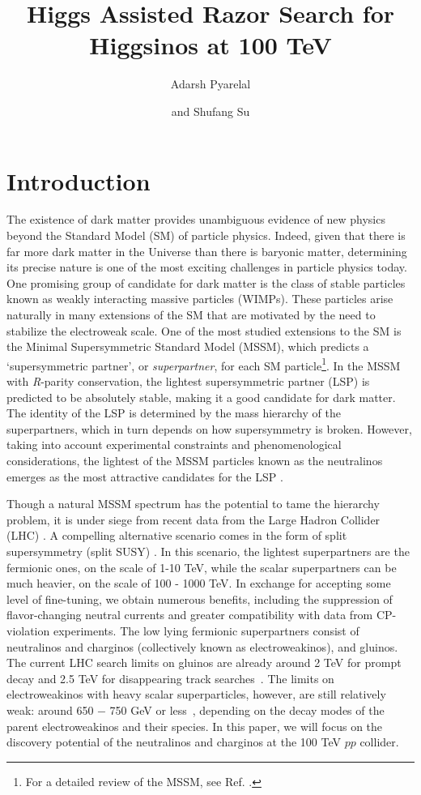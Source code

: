 \documentclass[a4paper,11pt]{article}
\title{Higgs Assisted Razor Search for Higgsinos at 100 TeV}
\author[a]{Adarsh Pyarelal}
\author[b]{and Shufang Su}
\affiliation[a]{School of Information, University of Arizona, Tucson, AZ 85718 , USA}
\affiliation[b]{Department of Physics, University of Arizona, Tucson, AZ 85718, USA}
\begin{document}
 
\maketitle

\section{Introduction}
 
The existence of dark matter provides unambiguous evidence of new physics
beyond the Standard Model (SM) of particle physics. Indeed, given that there is
far more dark matter in the Universe than there is baryonic matter, determining
its precise nature is one of the most exciting challenges in particle physics
today.  One promising group of candidate for dark matter is the class of stable
particles known as weakly interacting massive particles (WIMPs). These
particles arise naturally in many extensions of the SM that are motivated by
the need to stabilize the electroweak scale. One of the most studied extensions
to the SM is the Minimal Supersymmetric Standard Model (MSSM), which predicts a
`supersymmetric partner', or \emph{superpartner}, for each SM
particle\footnote{For a detailed review of the MSSM, see Ref.
\cite{Martin:1997ns}.}. In the MSSM with \emph{R}-parity conservation, the
lightest supersymmetric partner (LSP) is predicted to be absolutely stable,
making it a good candidate for dark matter. The identity of the LSP is
determined by the mass hierarchy of the superpartners, which in turn depends on
how supersymmetry is broken.  However, taking into account experimental
constraints and phenomenological considerations, the lightest of the  MSSM
particles known as the neutralinos emerges as the most attractive candidates
for the LSP \cite{Bertone:2004pz}. 

Though a natural MSSM spectrum has the potential to tame the hierarchy problem,
it is under siege from recent data from the Large Hadron Collider (LHC)
\cite{Aaboud:2018ujj, Sirunyan:2018vjp}.  A compelling alternative scenario
comes in the form of split supersymmetry (split SUSY) \cite{Wells:2003tf,
ArkaniHamed:2004yi, Giudice:2004tc}. In this scenario, the lightest
superpartners are the fermionic ones, on the scale of 1-10 TeV, while the
scalar superpartners can be much heavier, on the scale of 100 - 1000 TeV. In
exchange for accepting some level of fine-tuning, we obtain numerous benefits,
including the suppression of flavor-changing neutral currents and greater
compatibility with data from CP-violation experiments.  The low lying fermionic
superpartners consist of neutralinos and charginos (collectively known as
electroweakinos), and gluinos. The current LHC search limits on gluinos are
already around 2 TeV for prompt decay and 2.5 TeV for disappearing track
searches~\cite{CMS-PAS-SUS-19-005}.   The limits on electroweakinos with heavy
scalar superparticles, however, are still relatively weak: around 650 $-$ 750
GeV or less~\cite{ATL-PHYS-PUB-2019-022, Sirunyan:2017lae, Aaboud:2018htj,
Sirunyan:2018ubx, Aaboud:2018zeb}, depending on the decay modes of the parent
electroweakinos and their species.  In this paper, we will focus on the
discovery potential of the neutralinos and charginos at the 100 TeV $pp$
collider. 
\end{document}
